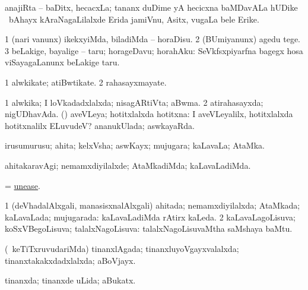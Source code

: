 \bentry
{}
\gl{\nA}
\expl{}
\bmng
 anajiRta -- baDitx, hecacxLa; tananx duDime yA hecicxna baMDavALa hUDike \mo\ bAhayx kAraNagaLilalxde Erida jamiVnu, Asitx, \mo vugaLa bele Erike. 
\emng
\eentry

\bentry
{} 
\gl{\sakirx}
\expl{}
\bmng
\bnum
\num{1} (nari \mo vanunx) ikekxyiMda, biladiMda -- horaDisu. 
\num{2} (BUmiyanunx) agedu tege. 
\num{3} beLakige, bayalige -- taru; horageDavu; horahAku:  SeVkfsxpiyarfna bagegx hosa viSayagaLanunx beLakige taru. 
\enum
\emng
\eentry

\bentry
{} 
\gl{\nA}
\expl{}
\bmng
\bnum
\num{1} alwkikate; atiBwtikate. 
\num{2} rahasayxmayate. 
\enum
\emng
\eentry

\bentry
{} 
\gl{\gu}
\bmng
\bnum
\num{1} alwkika; I loVkadadxlalxda; nisagARtiVta; aBwma. 
\num{2} atirahasayxda; nigUDhavAda. 
 (\AmA) 
\banum
{} aveVLeya; hotitxlalxda hotitxna:  I aveVLeyalilx, hotitxlalxda hotitxnalilx ELuvudeV? 
 ananukUlada; aswkayaRda. 
\eanum
\numie
\enum
\emng
\eentry

\bentry
{} 
\gl{\nA}
\expl{}
\bmng
 irusumurusu; ahita; kelxVsha; aswKayx; mujugara; kaLavaLa; AtaMka. 
\emng
\eentry

\bentry
{} 
\gl{\kirxvi}
\expl{}
\bmng
 ahitakaravAgi; nemamxdiyilalxde; AtaMkadiMda; kaLavaLadiMda. 
\emng
\eentry

\bentry
{} 
\gl{\nA}
\expl{}
\bmng
 = \hyperlink{unease}{unease}. 
\emng
\eentry

\bentry
{} 
\gl{\gu}
\bmng
\bnum
\num{1} (deVhadalAlxgali, manasisxnalAlxgali) ahitada; nemamxdiyilalxda; AtaMkada; kaLavaLada; mujugarada:  kaLavaLadiMda rAtirx kaLeda. 
\num{2} kaLavaLagoLisuva; koSxVBegoLisuva; talalxNagoLisuva:  talalxNagoLisuvaMtha saMshaya baMtu. 
\enum
\emng
\eentry

\bentry
{} 
\gl{\gu}
\expl{}
\bmng
 (\kanmu\ keTiTxruvudariMda) tinanxlAgada; tinanxluyoVgayxvalalxda; tinanxtakakxdadxlalxda; aBoVjayx. 
\emng
\eentry

\bentry
{} 
\gl{\gu}
\expl{}
\bmng
tinanxda; tinanxde uLida; aBukatx. 
\emng
\eentry

